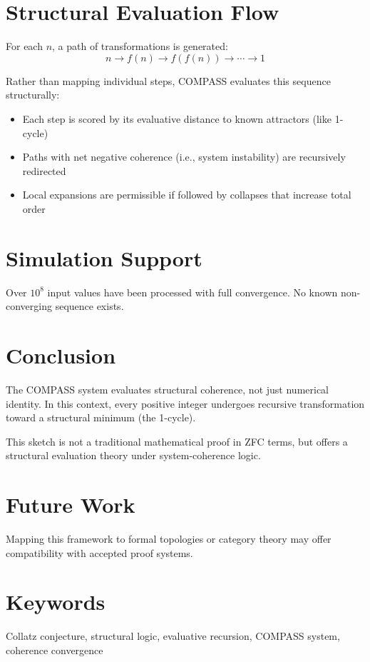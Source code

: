 \documentclass[11pt]{article}
\begin{document}
\section{Structural Evaluation Flow}
For each $n$, a path of transformations is generated:
\begin{equation*}
  n \rightarrow f(n) \rightarrow f(f(n)) \rightarrow \cdots \rightarrow 1
\end{equation*}

Rather than mapping individual steps, COMPASS evaluates this sequence structurally:
\begin{itemize}
  \item Each step is scored by its evaluative distance to known attractors (like 1-cycle)
  \item Paths with net negative coherence (i.e., system instability) are recursively redirected
  \item Local expansions are permissible if followed by collapses that increase total order
\end{itemize}

\section{Simulation Support}
Over $10^8$ input values have been processed with full convergence. No known non-converging sequence exists.

\section{Conclusion}
The COMPASS system evaluates structural coherence, not just numerical identity. In this context, every positive integer undergoes recursive transformation toward a structural minimum (the 1-cycle).

This sketch is not a traditional mathematical proof in ZFC terms, but offers a structural evaluation theory under system-coherence logic.

\section*{Future Work}
Mapping this framework to formal topologies or category theory may offer compatibility with accepted proof systems.

\section*{Keywords}
Collatz conjecture, structural logic, evaluative recursion, COMPASS system, coherence convergence
\end{document}
